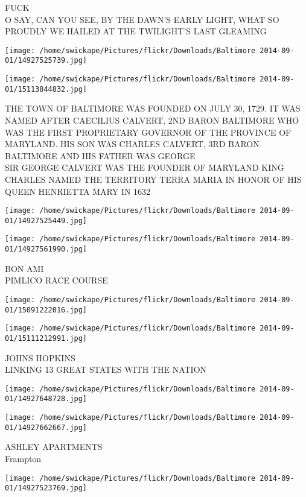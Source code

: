 \documentclass[10pt,letterpaper]{article}
\begin{document}
FUCK\\
O SAY, CAN YOU SEE, BY THE DAWN'S EARLY LIGHT, WHAT SO PROUDLY WE HAILED AT THE TWILIGHT'S LAST GLEAMING
\pagebreak

\texttt{[image: /home/swickape/Pictures/flickr/Downloads/Baltimore 2014-09-01/14927525739.jpg]}

\vspace{0.25in}
\texttt{[image: /home/swickape/Pictures/flickr/Downloads/Baltimore 2014-09-01/15113844832.jpg]}

THE TOWN OF BALTIMORE WAS FOUNDED ON JULY 30, 1729.  IT WAS NAMED AFTER CAECILIUS CALVERT, 2ND BARON BALTIMORE WHO WAS THE FIRST PROPRIETARY GOVERNOR OF THE PROVINCE OF MARYLAND.  HIS SON WAS CHARLES CALVERT, 3RD BARON BALTIMORE AND HIS FATHER WAS GEORGE\\
SIR GEORGE CALVERT WAS THE FOUNDER OF MARYLAND KING CHARLES NAMED THE TERRITORY TERRA MARIA IN HONOR OF HIS QUEEN HENRIETTA MARY IN 1632
\pagebreak

\texttt{[image: /home/swickape/Pictures/flickr/Downloads/Baltimore 2014-09-01/14927525449.jpg]}

\vspace{0.25in}
\texttt{[image: /home/swickape/Pictures/flickr/Downloads/Baltimore 2014-09-01/14927561990.jpg]}

BON AMI\\
PIMLICO RACE COURSE
\pagebreak

\texttt{[image: /home/swickape/Pictures/flickr/Downloads/Baltimore 2014-09-01/15091222016.jpg]}

\vspace{0.25in}
\texttt{[image: /home/swickape/Pictures/flickr/Downloads/Baltimore 2014-09-01/15111212991.jpg]}

JOHNS HOPKINS\\
LINKING 13 GREAT STATES WITH THE NATION
\pagebreak

\texttt{[image: /home/swickape/Pictures/flickr/Downloads/Baltimore 2014-09-01/14927648728.jpg]}

\vspace{0.25in}
\texttt{[image: /home/swickape/Pictures/flickr/Downloads/Baltimore 2014-09-01/14927662667.jpg]}

ASHLEY APARTMENTS\\
Frampton
\pagebreak

\texttt{[image: /home/swickape/Pictures/flickr/Downloads/Baltimore 2014-09-01/14927523769.jpg]}
\end{document}
